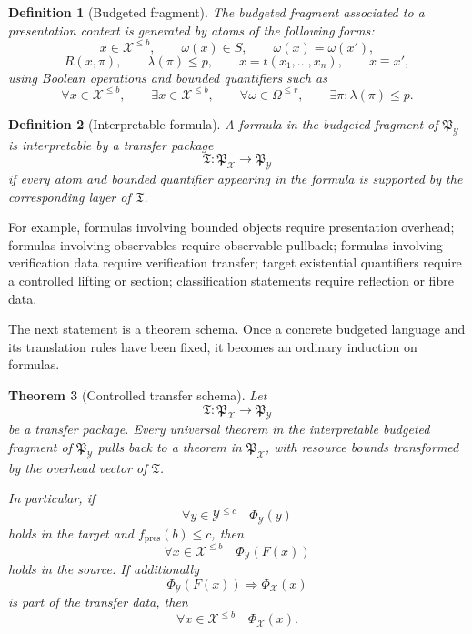 \documentclass[11pt]{article}
\newtheorem{theorem}{Theorem}[section]
\newtheorem{definition}[theorem]{Definition}
\begin{document}
\begin{definition}[Budgeted fragment]
The budgeted fragment associated to a presentation context is generated by atoms of the following forms:
\[
x\in\mathcal X^{\leq b},
\qquad
\omega(x)\in S,
\qquad
\omega(x)=\omega(x'),
\]
\[
R(x,\pi),
\qquad
\lambda(\pi)\leq p,
\qquad
x=t(x_1,\ldots,x_n),
\qquad
x\equiv x',
\]
using Boolean operations and bounded quantifiers such as
\[
\forall x\in\mathcal X^{\leq b},
\qquad
\exists x\in\mathcal X^{\leq b},
\qquad
\forall \omega\in\Omega^{\leq r},
\qquad
\exists \pi:\lambda(\pi)\leq p.
\]
\end{definition}

\begin{definition}[Interpretable formula]
A formula in the budgeted fragment of \(\mathfrak P_\mathcal Y\) is interpretable by a transfer package
\[
\mathfrak T:\mathfrak P_\mathcal X\to\mathfrak P_\mathcal Y
\]
if every atom and bounded quantifier appearing in the formula is supported by the corresponding layer of \(\mathfrak T\).
\end{definition}

For example, formulas involving bounded objects require presentation overhead; formulas involving observables require observable pullback; formulas involving verification data require verification transfer; target existential quantifiers require a controlled lifting or section; classification statements require reflection or fibre data.

The next statement is a theorem schema. Once a concrete budgeted language and its translation rules have been fixed, it becomes an ordinary induction on formulas.

\begin{theorem}[Controlled transfer schema]
Let
\[
\mathfrak T:\mathfrak P_\mathcal X\to\mathfrak P_\mathcal Y
\]
be a transfer package. Every universal theorem in the interpretable budgeted fragment of \(\mathfrak P_\mathcal Y\) pulls back to a theorem in \(\mathfrak P_\mathcal X\), with resource bounds transformed by the overhead vector of \(\mathfrak T\).

In particular, if
\[
\forall y\in\mathcal Y^{\leq c}\quad \Phi_\mathcal Y(y)
\]
holds in the target and \(f_{\mathrm{pres}}(b)\leq c\), then
\[
\forall x\in\mathcal X^{\leq b}\quad \Phi_\mathcal Y(F(x))
\]
holds in the source. If additionally
\[
\Phi_\mathcal Y(F(x))\Longrightarrow \Phi_\mathcal X(x)
\]
is part of the transfer data, then
\[
\forall x\in\mathcal X^{\leq b}\quad \Phi_\mathcal X(x).
\]
\end{theorem}
\end{document}
